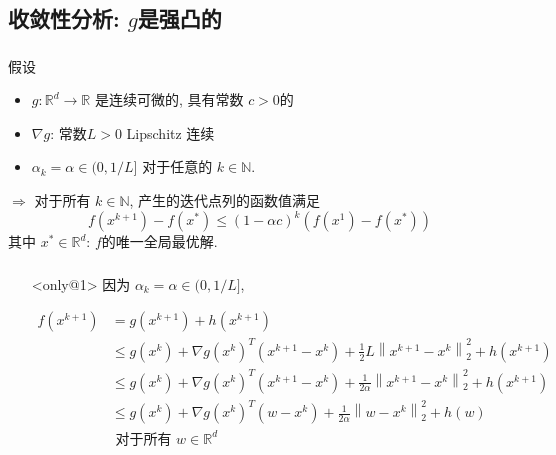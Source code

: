 \documentclass[handout]{beamer}
\begin{document}
\subsection{收敛性分析: $g$是强凸的}
\begin{frame}

\frametitle{\subsecno \subsecname}

\begin{mytheorem}[收敛]
假设
\begin{itemize}
\item $g: \mathbb{R}^{d} \rightarrow \mathbb{R}$ 是连续可微的,  具有常数 $c>0$的

\item  $\nabla g$: 常数$L>0 $ Lipschitz 连续 
\item $\alpha_{k}=\alpha \in(0,1 / L]$ 对于任意的 $k \in \mathbb{N} .$
\end{itemize}

 $\Rightarrow$  对于所有 $k \in \mathbb{N}$, 产生的迭代点列的函数值满足
$$
f\left(x^{k+1}\right)-f\left(x^{*}\right) \leq(1-\alpha c)^{k}\left(f\left(x^{1}\right)-f\left(x^{*}\right)\right)
$$
其中 $x^{*} \in \mathbb{R}^{d}$: $f$的唯一全局最优解.
\end{mytheorem}

\end{frame}
\begin{frame}

\frametitle{\subsecno \subsecname}




\begin{itemize}
  \item[]<only@1>
因为 $\alpha_{k}=\alpha \in(0,1 / L]$,

\begin{footnotesize}

$$
\begin{aligned}
f\left(x^{k+1}\right) &=g\left(x^{k+1}\right)+h\left(x^{k+1}\right) \\
& \leq g\left(x^{k}\right)+\nabla g\left(x^{k}\right)^{T}\left(x^{k+1}-x^{k}\right)+\frac{1}{2} L\left\|x^{k+1}-x^{k}\right\|_{2}^{2}+h\left(x^{k+1}\right) \\
& \leq g\left(x^{k}\right)+\nabla g\left(x^{k}\right)^{T}\left(x^{k+1}-x^{k}\right)+\frac{1}{2 \alpha}\left\|x^{k+1}-x^{k}\right\|_{2}^{2}+h\left(x^{k+1}\right) \\
& \leq g\left(x^{k}\right)+\nabla g\left(x^{k}\right)^{T}\left(w-x^{k}\right)+\frac{1}{2 \alpha}\left\|w-x^{k}\right\|_{2}^{2}+h(w) \\
&\text { 对于所有 } w \in \mathbb{R}^{d}
\end{aligned}
$$


\end{footnotesize}
\end{itemize}
\end{frame}
\end{document}
